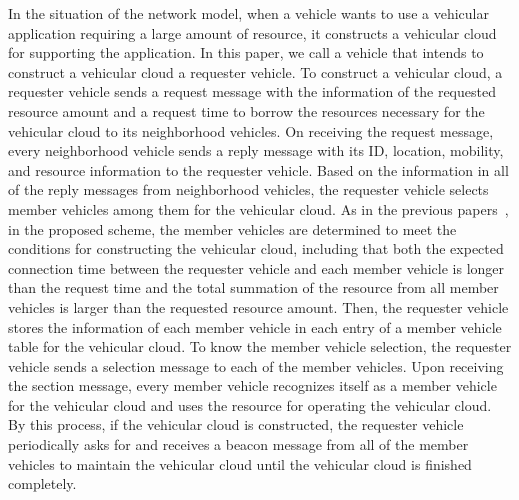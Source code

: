\documentclass[electronics,aricle,accept,pdftex,moreauthors]{Definitions/mdpi}
\begin{document}
In the situation of the network model, when a vehicle wants to use a vehicular application requiring a large amount of resource, it constructs a vehicular cloud for supporting the application.
In this paper, we call a vehicle that intends to construct a vehicular cloud a requester vehicle.
To construct a vehicular cloud, a requester vehicle sends a request message with the information of the requested resource amount and a request time to borrow the resources necessary for the vehicular cloud to its neighborhood vehicles. 
On receiving the request message, every neighborhood vehicle sends a reply message with its ID, location, mobility, and resource information to the requester vehicle.
Based on the information in all of the reply messages from neighborhood vehicles, the requester vehicle selects member vehicles among them for the vehicular cloud.
As in the previous papers~\cite{Lee2019, Choi2018, Meneguette2017j}, in the proposed scheme, the member vehicles are determined to meet the conditions for constructing the vehicular cloud, including that both the expected connection time between the requester vehicle and each member vehicle is longer than the request time and the total summation of the resource from all member vehicles is larger than the requested resource amount.
Then, the requester vehicle stores the information of each member vehicle in each entry of a member vehicle table for the vehicular cloud.
To know the member vehicle selection, the requester vehicle sends a selection message to each of the member vehicles.
Upon receiving the section message, every member vehicle recognizes itself as a member vehicle for the vehicular cloud and uses the resource for operating the vehicular cloud.
By this process, if the vehicular cloud is constructed, the requester vehicle periodically asks for and receives a beacon message from all of the member vehicles to maintain the vehicular cloud until the vehicular cloud is finished completely.


\end{document}
